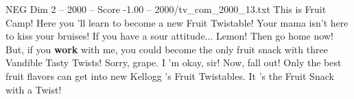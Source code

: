 \begin{textsample}{NEG Dim 2 – 2000 – Score -1.00 – 2000/tv\_com\_2000\_13.txt}  \label{ex:f2_neg_004}
This is Fruit Camp!
Here you 'll learn to become a new Fruit Twistable!
Your mama isn't here to kiss your bruises!
If you have a sour attitude...
Lemon!
Then go home now!
But, if you \textbf{work} with me, you could become the only fruit snack with three Vandible Tasty Twists!
Sorry, grape.
I 'm okay, sir!
Now, fall out!
Only the best fruit flavors can get into new Kellogg 's Fruit Twistables.
It 's the Fruit Snack with a Twist!

\end{textsample}
